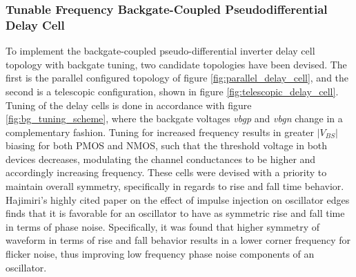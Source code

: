 			\subsubsection{Tunable Frequency Backgate-Coupled Pseudodifferential Delay Cell}
			To implement the backgate-coupled pseudo-differential inverter delay cell topology with backgate tuning, two candidate topologies have been devised. The first is the parallel configured topology of figure \ref{fig:parallel_delay_cell}, and the second is a telescopic configuration, shown in figure \ref{fig:telescopic_delay_cell}. Tuning of the delay cells is done in accordance with figure \ref{fig:bg_tuning_scheme}, where the backgate voltages \textit{vbgp} and \textit{vbgn} change in a complementary fashion. Tuning for increased frequency results in greater $|V_{BS}|$ biasing for both PMOS and NMOS, such that the threshold voltage in both devices decreases, modulating the channel conductances to be higher and accordingly increasing frequency. These cells were devised with a priority to maintain overall symmetry, specifically in regards to rise and fall time behavior. Hajimiri's highly cited paper \cite{Hajimiri1998} on the effect of impulse injection on oscillator edges finds that it is favorable for an oscillator to have as symmetric rise and fall time in terms of phase noise. Specifically, it was found that higher symmetry of waveform in terms of rise and fall behavior results in a lower corner frequency for flicker noise, thus improving low frequency phase noise components of an oscillator. 


